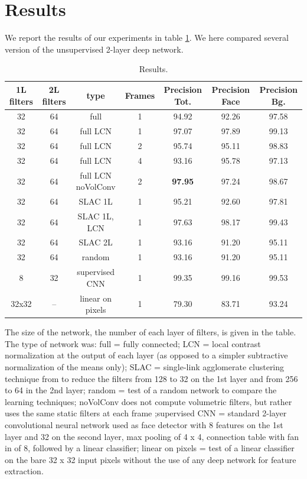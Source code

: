 \documentclass{article} %
\begin{document}



\section{Results}
\label{sec-results}


We report the results of our experiments in table \ref{table1}. We here compared several version of the unsupervised 2-layer deep network. 

\begin{table}[htdp]
\caption{Results.}
\begin{center}
\begin{tabular}{|c|c|c|c|c|c|c|}
\hline\hline
1L filters	& 2L filters	& type	& Frames	& Precision Tot. & Precision Face  & Precision Bg. \\ 
\hline
32 		& 64 		& full					& 1	& 94.92  		& 92.26		& 97.58  \\
32 		& 64 		& full LCN				& 1	& 97.07 		& 97.89		& 99.13  \\
32 		& 64 		& full	 LCN				& 2	& 95.74		& 95.11		& 98.83  \\
32 		& 64 		& full LCN				& 4	& 93.16  		& 95.78		& 97.13  \\ 
32 		& 64 		& full LCN noVolConv	& 2	& \bf{97.95}  	& 97.24		& 98.67  \\ 
32 		& 64 		& SLAC 1L			& 1	& 95.21  		& 92.60		& 97.81  \\
32 		& 64 		& SLAC 1L, LCN		& 1	& 97.63 		& 98.17		& 99.43  \\ 
32 		& 64 		& SLAC 2L			& 1	& 93.16 		& 91.20		& 95.11  \\ 
32 		& 64 		& random				& 1	& 93.16 		& 91.20		& 95.11  \\ 
8 		& 32 		& supervised CNN		& 1	& 99.35 		& 99.16		& 99.53  \\ 
32x32 	& -- 		& linear on pixels		& 1	& 79.30 		& 83.71		& 93.24  \\ 
\hline\hline
\end{tabular}
\end{center}
\label{table1}
\end{table}


The size of the network, the number of each layer of filters,  is given in the table. The type of network was: full = fully connected; LCN = local contrast normalization at the output of each layer (as opposed to a simpler subtractive normalization of the means only); SLAC = single-link agglomerate clustering technique from \cite{coates2012learning} to reduce the filters from 128 to 32 on the 1st layer and from 256 to 64 in the 2nd layer; random = test of a random network to compare the learning techniques; noVolConv does not compute volumetric filters, but rather uses the same static filters at each frame ;supervised CNN = standard 2-layer convolutional neural network used as face detector with 8 features on the 1st layer and 32 on the second layer, max pooling of 4 x 4, connection table with fan in of 8, followed by a linear classifier; linear on pixels = test of a linear classifier on the bare 32 x 32 input pixels without the use of any deep network for feature extraction.
\end{document}
